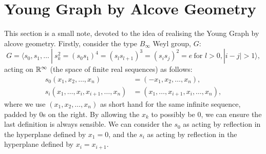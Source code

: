 
\section{Young Graph by Alcove Geometry}
This section is a small note, devoted to the idea of realising the Young Graph by alcove geometry. Firstly, consider the type $B_{\infty}$ Weyl group, $G$:
\[ G=\langle s_0, s_1,\dots \ | \ s_k^2=(s_0 s_1)^4=(s_{l}s_{l+1})^3=(s_i s_j)^2=e \ \text{for }l>0, |i-j|>1 \rangle,\]
acting on $\mathbb{R}^\infty$ (the space of finite real sequences) as follows:
\begin{align*}
    s_0(x_1,x_2,\dots,x_n)&=(-x_1,x_2,\dots,x_n),\\
    s_i(x_1,\dots,x_i,x_{i+1},\dots,x_n)&=(x_1,\dots,x_{i+1},x_i,\dots,x_n),
\end{align*}
where we use $(x_1,x_2,\dots,x_n)$ as short hand for the same infinite sequence, padded by 0s on the right. By allowing the $x_k$ to possibly be 0, we can ensure the last definition is always sensible. We can consider the $s_0$ as acting by reflection in the hyperplane defined by $x_1=0$, and the $s_i$ as acting by reflection in the hyperplane defined by $x_i=x_{i+1}$.

